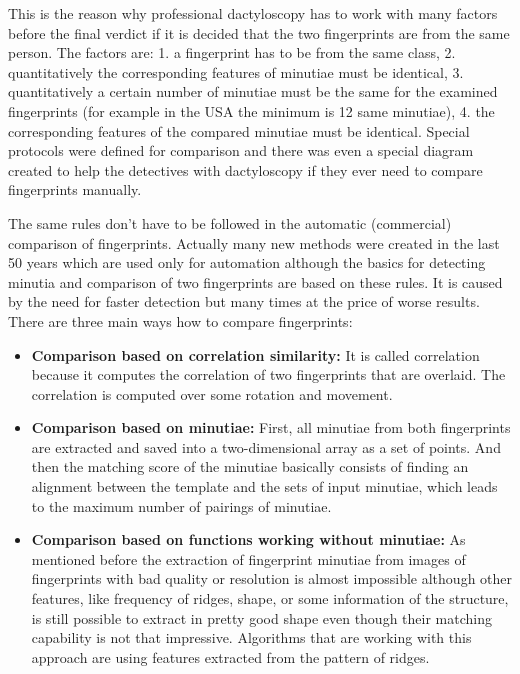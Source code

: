 This is the reason why professional dactyloscopy has to work with many factors before the final verdict if it is decided that the two fingerprints are from the same person. The factors are: 1. a fingerprint has to be from the same class, 2. quantitatively the corresponding features of minutiae must be identical, 3. quantitatively a certain number of minutiae must be the same for the examined fingerprints (for example in the USA the minimum is 12 same minutiae), 4. the corresponding features of the compared minutiae must be identical. Special protocols were defined for comparison and there was even a special diagram created to help the detectives with dactyloscopy if they ever need to compare fingerprints manually. \cite{frr_described} \cite{wayman2005biometric}

The same rules don’t have to be followed in the automatic (commercial) comparison of fingerprints. Actually many new methods were created in the last 50 years which are used only for automation although the basics for detecting minutia and comparison of two fingerprints are based on these rules. It is caused by the need for faster detection but many times at the price of worse results. There are three main ways how to compare fingerprints: \cite{jain2007handbook} \cite{maltoni2009handbook}

\begin{itemize}
	\item \textbf{Comparison based on correlation similarity:} 
	It is called correlation because it computes the correlation of two fingerprints that are overlaid. The correlation is computed over some rotation and movement. \cite{jain2007handbook} \cite{maltoni2009handbook}
	
	\item\textbf{Comparison based on minutiae:}
	First, all minutiae from both fingerprints are extracted and saved into a two-dimensional array as a set of points. And then the matching score of the minutiae basically consists of finding an alignment between the template and the sets of input minutiae, which leads to the maximum number of pairings of minutiae. \cite{jain2007handbook} \cite{maltoni2009handbook}

	\item \textbf{Comparison based on functions working without minutiae:}
	As mentioned before the extraction of fingerprint minutiae from images of fingerprints with bad quality or resolution is almost impossible although other features, like frequency of ridges, shape, or some information of the structure, is still possible to extract in pretty good shape even though their matching capability is not that impressive. Algorithms that are working with this approach are using features extracted from the pattern of ridges. \cite{jain2007handbook} \cite{maltoni2009handbook}
\end{itemize}

